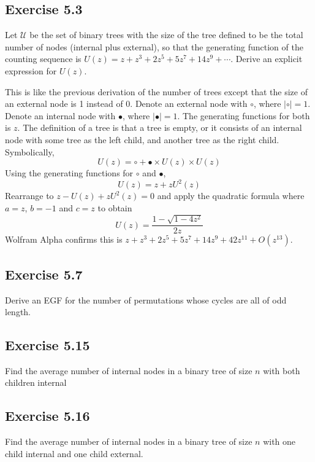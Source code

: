 \documentclass[11pt, oneside]{article}   	%
\begin{document}
\subsection*{Exercise 5.3}
Let $\mathcal{U}$ be the set of binary trees with the size of the tree defined to be the total number of nodes (internal plus external), so that
the generating function of the counting sequence is $U(z) = z + z^3 + 2z^5 + 5z^7 + 14z^9 + \cdots$. Derive an explicit expression for $U(z)$.

This is like the previous derivation of the number of trees except that the size of an external node is 1 instead of 0. Denote an external node
with $\circ$, where $\left| \circ \right| = 1$. Denote an internal node with $\bullet$, where $\left| \bullet \right| = 1$.  The generating functions for
both is $z$. The definition of a tree is that a tree is empty, or it consists of an internal node with some tree as the left child, and another tree as the right child.
Symbolically,
\[
	U(z) = \circ + \bullet \times U(z) \times U(z)
\]
Using the generating functions for $\circ$ and $\bullet$,
\[
	U(z) = z + zU^2(z)
\]
Rearrange to $z - U(z) + zU^2(z) = 0$ and apply the quadratic formula where $a=z$, $b=-1$ and $c=z$ to obtain
\[
	U(z) = \frac{1-\sqrt{1-4z^2}}{2z}
\]
Wolfram Alpha confirms this is $z + z^3 + 2z^5 + 5z^7 + 14z^9 + 42z^{11} + O(z^{13})$.

\subsection*{Exercise 5.7}
Derive an EGF for the number of permutations whose cycles are all of odd length.

\subsection*{Exercise 5.15}
Find the average number of internal nodes in a binary tree of size $n$ with both children internal

\subsection*{Exercise 5.16}
Find the average number of internal nodes in a binary tree of size $n$ with one child internal and one child external.
\end{document}
